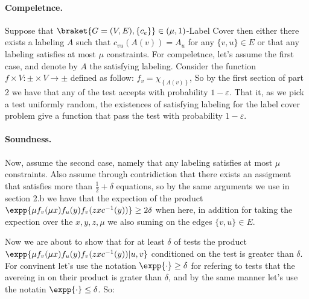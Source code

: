 \documentclass{article}
\newcommand{\Chi}[1]{\chi_{ \left\{ #1  \right\} } }
\begin{document}
\paragraph{Compeletnce. } Suppose that $\braket{G=(V,E), \{ c_{e} \} } \in (\mu,1)$-Label Cover then either there exists a labeling $A$ such that $c_{vu}(A(v)) = A_{u}$ for any $\{v,u\}\in E$ or that any labeling satisfies at most $\mu$ constraints. For compeletnce, let's assume the first case, and denote by $A$ the satisfying labeling. Consider the function $f \times V : \pm \times V \rightarrow \pm$ defined as follow: $f_{v} = \Chi{A(v)}$, So by the first section of part 2 we have that any of the test accepts with probability $1-\varepsilon$. That it, as we pick a test uniformly random, the existences of satisfying labeling for the label cover problem give a function that pass the test with probability $1-\varepsilon$. 
\paragraph{Soundness.} Now, assume the second case, namely that any labeling satisfies at most $\mu$ constraints. Also assume through contridiction that there exists an assigment that satisfies more than $\frac{1}{2}+\delta$ equations, so by the same arguments we use in section 2.b we have that the expection of the product $ \expp{\mu f_{v}(\mu x )f_{u}(y)f_{v}(zx c^{-1}(y))} \ge 2 \delta$ when here, in addition for taking the expection over the $x,y,z,\mu$ we also suming on the edges $\{v,u\}\in E$. 

Now we are about to show that for at least $\delta$ of tests the product $ \expp{\mu f_{v}(\mu x )f_{u}(y)f_{v}(zx c^{-1}(y)) | u,v }$ conditioned on the test is greater than $\delta$. For convinent let's use the notation $\expp{ \cdot } \ge \delta$ for refering to tests that the avereing in on their product is grater than $\delta$, and by the same manner let's use the notatin $\expp{\cdot } \le \delta$. So:   
\end{document}

